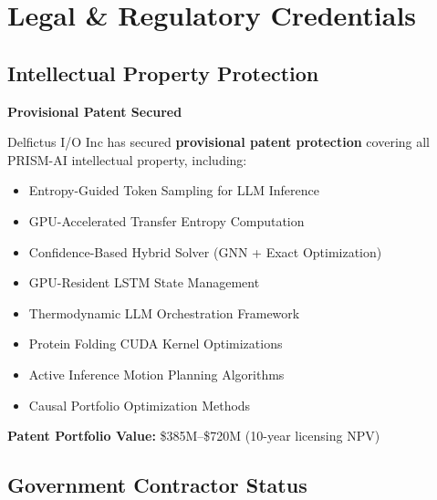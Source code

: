 \documentclass[11pt,letterpaper]{article}
\begin{document}
\newpage

\section{Legal \& Regulatory Credentials}

\subsection{Intellectual Property Protection}

\begin{tcolorbox}[colback=lightgray,colframe=successgreen,title=Patent Status]
\textbf{Provisional Patent Secured}

\vspace{0.3cm}
Delfictus I/O Inc has secured \textbf{provisional patent protection} covering all PRISM-AI intellectual property, including:
\begin{itemize}[leftmargin=*]
    \item Entropy-Guided Token Sampling for LLM Inference
    \item GPU-Accelerated Transfer Entropy Computation
    \item Confidence-Based Hybrid Solver (GNN + Exact Optimization)
    \item GPU-Resident LSTM State Management
    \item Thermodynamic LLM Orchestration Framework
    \item Protein Folding CUDA Kernel Optimizations
    \item Active Inference Motion Planning Algorithms
    \item Causal Portfolio Optimization Methods
\end{itemize}

\vspace{0.3cm}
\textbf{Patent Portfolio Value:} \$385M--\$720M (10-year licensing NPV)
\end{tcolorbox}

\subsection{Government Contractor Status}
\end{document}
